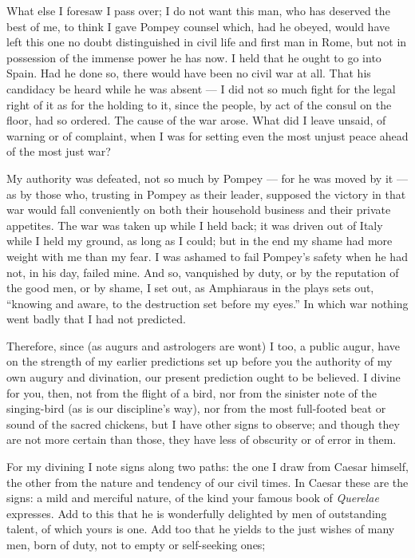  What else I foresaw I pass over; I do not want this man, who has deserved the best of me, to think I gave Pompey counsel which, had he obeyed, would have left this one no doubt distinguished in civil life and first man in Rome, but not in possession of the immense power he has now. I held that he ought to go into Spain. Had he done so, there would have been no civil war at all. That his candidacy be heard while he was absent --- I did not so much fight for the legal right of it as for the holding to it, since the people, by act of the consul on the floor, had so ordered. The cause of the war arose. What did I leave unsaid, of warning or of complaint, when I was for setting even the most unjust peace ahead of the most just war?

 My authority was defeated, not so much by Pompey --- for he was moved by it --- as by those who, trusting in Pompey as their leader, supposed the victory in that war would fall conveniently on both their household business and their private appetites. The war was taken up while I held back; it was driven out of Italy while I held my ground, as long as I could; but in the end my shame had more weight with me than my fear. I was ashamed to fail Pompey's safety when he had not, in his day, failed mine. And so, vanquished by duty, or by the reputation of the good men, or by shame, I set out, as Amphiaraus in the plays sets out, ``knowing and aware, to the destruction set before my eyes.'' In which war nothing went badly that I had not predicted.

 Therefore, since (as augurs and astrologers are wont) I too, a public augur, have on the strength of my earlier predictions set up before you the authority of my own augury and divination, our present prediction ought to be believed. I divine for you, then, not from the flight of a bird, nor from the sinister note of the singing-bird (as is our discipline's way), nor from the most full-footed beat or sound of the sacred chickens, but I have other signs to observe; and though they are not more certain than those, they have less of obscurity or of error in them.

 For my divining I note signs along two paths: the one I draw from Caesar himself, the other from the nature and tendency of our civil times. In Caesar these are the signs: a mild and merciful nature, of the kind your famous book of \textit{Querelae} expresses. Add to this that he is wonderfully delighted by men of outstanding talent, of which yours is one. Add too that he yields to the just wishes of many men, born of duty, not to empty or self-seeking ones;

